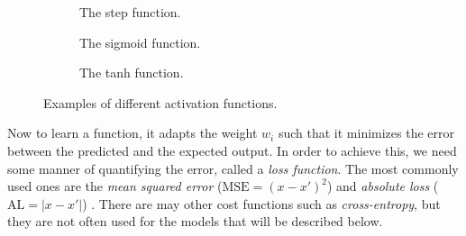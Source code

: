 \begin{figure}[ht]
  \begin{subfigure}[b]{0.32\textwidth}
    \centering
    \caption{The step function.}
  \end{subfigure}
  \begin{subfigure}[b]{0.32\textwidth}
    \centering
    \caption{The sigmoid function.}
  \end{subfigure}
  \begin{subfigure}[b]{0.32\textwidth}
    \centering
    \caption{The tanh function.}
  \end{subfigure}
  \caption{Examples of different activation functions.}

\label{fig:activation-functions}
\end{figure}

Now to learn a function, it adapts the weight $w_i$ such that it minimizes the error between the predicted and the expected output.
In order to achieve this, we need some manner of quantifying the error, called a \textit{loss function}.
The most commonly used ones are the \textit{mean squared error} ($\text{MSE} = (x - x')^2$) and \textit{absolute loss} ($\text{AL} = | x - x' |$) \cite{nielsen_2017}.
There are may other cost functions such as \textit{cross-entropy}, but they are not often used for the models that will be described below.

